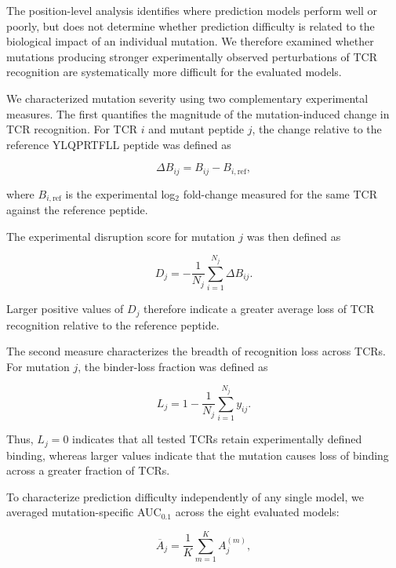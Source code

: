 \documentclass{article}
\begin{document}
The position-level analysis identifies where prediction models perform well
or poorly, but does not determine whether prediction difficulty is related to
the biological impact of an individual mutation. We therefore examined
whether mutations producing stronger experimentally observed perturbations of
TCR recognition are systematically more difficult for the evaluated models.

We characterized mutation severity using two complementary experimental
measures. The first quantifies the magnitude of the mutation-induced change
in TCR recognition. For TCR $i$ and mutant peptide $j$, the change relative
to the reference YLQPRTFLL peptide was defined as

\begin{equation}
\Delta B_{ij}
=
B_{ij}
-
B_{i,\mathrm{ref}},
\label{eq:delta_binding}
\end{equation}

where $B_{i,\mathrm{ref}}$ is the experimental log$_2$ fold-change measured
for the same TCR against the reference peptide.

The experimental disruption score for mutation $j$ was then defined as

\begin{equation}
D_j
=
-
\frac{1}{N_j}
\sum_{i=1}^{N_j}
\Delta B_{ij}.
\label{eq:disruption}
\end{equation}

Larger positive values of $D_j$ therefore indicate a greater average loss of
TCR recognition relative to the reference peptide.

The second measure characterizes the breadth of recognition loss across
TCRs. For mutation $j$, the binder-loss fraction was defined as

\begin{equation}
L_j
=
1-
\frac{1}{N_j}
\sum_{i=1}^{N_j}
y_{ij}.
\label{eq:binder_loss}
\end{equation}

Thus, $L_j=0$ indicates that all tested TCRs retain experimentally defined
binding, whereas larger values indicate that the mutation causes loss of
binding across a greater fraction of TCRs.

To characterize prediction difficulty independently of any single model, we
averaged mutation-specific AUC$_{0.1}$ across the eight evaluated models:

\begin{equation}
\overline{A}_j
=
\frac{1}{K}
\sum_{m=1}^{K}
A_j^{(m)},
\label{eq:cross_model_auc}
\end{equation}
\end{document}
